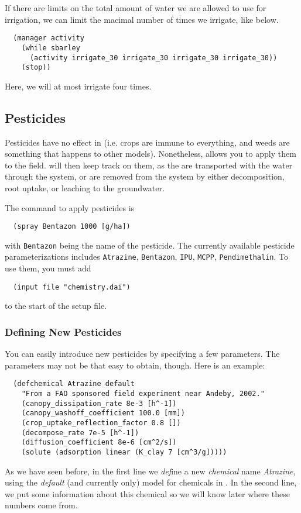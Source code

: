 \documentclass[a4paper,11pt]{article}
\begin{document}
If there are limits on the total amount of water we are allowed to use
for irrigation, we can limit the macimal number of times we irrigate,
like below.
\begin{verbatim}
  (manager activity
    (while sbarley
      (activity irrigate_30 irrigate_30 irrigate_30 irrigate_30))
    (stop))
\end{verbatim}
Here, we will at most irrigate four times.

\subsection{Pesticides}
\label{sec:pesticides}

Pesticides have no effect in \daisy{} (i.e. \daisy{} crops are immune
to everything, and weeds are something that happens to other models).
Nonetheless, \daisy{} allows you to apply them to the field.  \Daisy{}
will then keep track on them, as the are transported with the water
through the system, or are removed from the system by either
decomposition, root uptake, or leaching to the groundwater.

The command to apply pesticides is
\begin{verbatim}
  (spray Bentazon 1000 [g/ha])
\end{verbatim}
with \texttt{Bentazon} being the name of the pesticide.  The currently
available pesticide parameterizations includes \texttt{Atrazine},
\texttt{Bentazon}, \texttt{IPU}, \texttt{MCPP},
\texttt{Pendimethalin}.  To use them, you must add
\begin{verbatim}
  (input file "chemistry.dai")
\end{verbatim}
to the start of the setup file.

\subsubsection{Defining New Pesticides}

You can easily introduce new pesticides by specifying a few
parameters.  The parameters may not be that easy to obtain, though.
Here is an example:
\begin{verbatim}
  (defchemical Atrazine default
    "From a FAO sponsored field experiment near Andeby, 2002."
    (canopy_dissipation_rate 8e-3 [h^-1])
    (canopy_washoff_coefficient 100.0 [mm])
    (crop_uptake_reflection_factor 0.8 [])
    (decompose_rate 7e-5 [h^-1])
    (diffusion_coefficient 8e-6 [cm^2/s])
    (solute (adsorption linear (K_clay 7 [cm^3/g]))))
\end{verbatim}
As we have seen before, in the first line we \emph{def}ine a new
\emph{chemical} name \emph{Atrazine}, using the \emph{default} (and
currently only) model for chemicals in \daisy{}.  In the second line,
we put some information about this chemical so we will know later
where these numbers come from.
\end{document}
